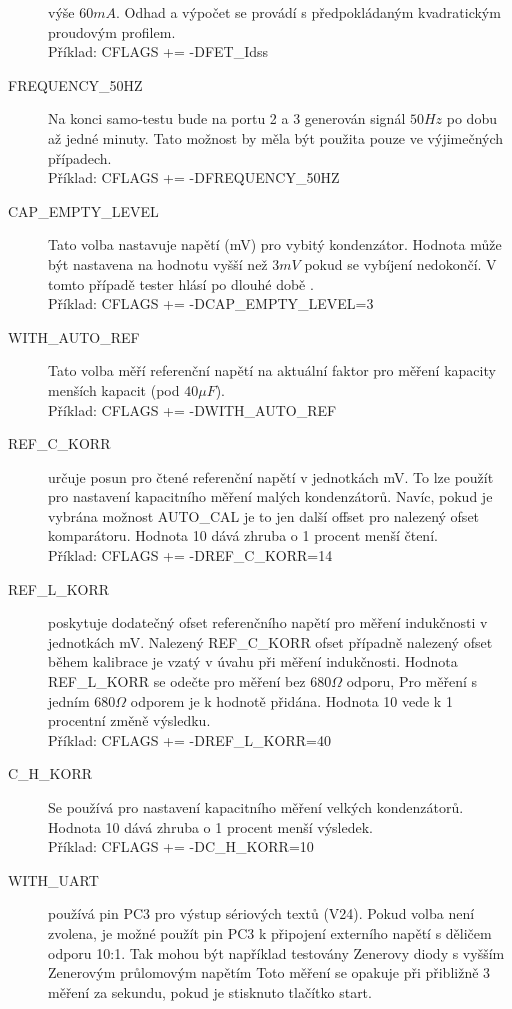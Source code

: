 \begin{description}
výše \(60mA\). Odhad a výpočet se provádí s předpokládaným kvadratickým proudovým profilem.\\
Příklad: CFLAGS += -DFET\_Idss
  \item[FREQUENCY\_50HZ] Na konci samo-testu bude na portu 2 a 3 generován signál \(50Hz\) po
dobu až jedné minuty.
Tato možnost by měla být použita pouze ve výjimečných případech.\\
Příklad: CFLAGS += -DFREQUENCY\_50HZ
  \item[CAP\_EMPTY\_LEVEL] Tato volba nastavuje napětí (mV) pro vybitý kondenzátor.
Hodnota může být nastavena na hodnotu vyšší než \(3mV\) pokud se vybíjení nedokončí.
V tomto případě tester hlásí po dlouhé době .\\
Příklad: CFLAGS += -DCAP\_EMPTY\_LEVEL=3
  \item[WITH\_AUTO\_REF] Tato volba měří referenční napětí na aktuální faktor pro měření kapacity
menších kapacit (pod \(40\mu F\)).\\
Příklad: CFLAGS += -DWITH\_AUTO\_REF
  \item[REF\_C\_KORR] určuje posun pro čtené referenční napětí v jednotkách mV.
To lze použít pro nastavení kapacitního měření malých kondenzátorů.
Navíc, pokud je vybrána možnost AUTO\_CAL je to jen další offset pro
nalezený ofset komparátoru.
Hodnota 10 dává zhruba o 1 procent menší čtení.\\
Příklad: CFLAGS += -DREF\_C\_KORR=14
  \item[REF\_L\_KORR] poskytuje dodatečný ofset referenčního napětí pro měření indukčnosti
v jednotkách mV. Nalezený REF\_C\_KORR ofset případně nalezený ofset během kalibrace
je vzatý v úvahu při měření indukčnosti.
Hodnota REF\_L\_KORR se odečte pro měření bez \(680\Omega\) odporu,
Pro měření s jedním \(680\Omega\) odporem je  k hodnotě přidána.
Hodnota 10 vede k 1 procentní změně výsledku.\\
Příklad: CFLAGS += -DREF\_L\_KORR=40
  \item[C\_H\_KORR] Se používá pro nastavení kapacitního měření velkých kondenzátorů.
Hodnota 10 dává zhruba o 1 procent menší výsledek.\\
Příklad: CFLAGS += -DC\_H\_KORR=10
  \item[WITH\_UART] používá pin PC3 pro výstup sériových textů (V24). Pokud volba není zvolena,
je možné použít pin PC3 k připojení externího napětí s děličem odporu 10:1.
Tak mohou být například testovány Zenerovy diody s vyšším Zenerovým průlomovým napětím
Toto měření se opakuje při přibližně 3 měření za sekundu, pokud je stisknuto tlačítko start.\\

\end{description}
